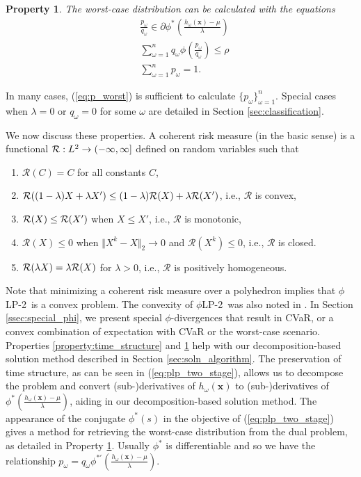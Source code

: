 \documentclass[ijoc,letterpaper]{informs3} %
\newcommand{\x}{\mathbf{x}}
\newtheorem{property}[theorem]{Property}
\newcommand{\plp}{$\phi$LP-2}
\begin{document}
\begin{property}
	\label{property:primal_dual_relation}
	The worst-case distribution can be calculated with the equations
	\begin{align} 
		& \frac{p_\omega}{q_\omega} \in \partial \phi^*\left(\frac{h_\omega(\x)-\mu}{\lambda}\right) \label{eq:p_worst} \\
		& \sum_{\omega=1}^n q_\omega \phi\left(\frac{p_\omega}{q_\omega}\right) \leq \rho \nonumber \\
		& \sum_{\omega=1}^n p_\omega = 1. \nonumber
	\end{align}
\end{property}
In many cases, (\ref{eq:p_worst}) is sufficient to calculate $\{p_\omega\}_{\omega=1}^n$.
Special cases when $\lambda = 0$ or $q_\omega = 0$ for some $\omega$ are detailed in Section \ref{sec:classification}.

We now discuss these properties. A coherent risk measure (in the basic sense) is a functional ${\cal R}: L^2 \rightarrow (-\infty,\infty]$ defined on random variables such that \citep{rockafellar2007coherent}
\begin{enumerate}
	\item $\mathcal{R}(C) = C$ for all constants $C$,
	\item $\mathcal{R}((1-\lambda)X + \lambda X') \leq (1-\lambda){\cal R}(X) + \lambda {\cal R}(X')$, i.e., $\mathcal{R}$ is convex,
	\item $\mathcal{R}(X) \leq {\cal R}(X')$ when $X \leq X'$, i.e., $\mathcal{R}$ is monotonic,
	\item $\mathcal{R}(X) \leq 0$ when $\Vert X^k - X \Vert_2 \rightarrow 0$ and $\mathcal{R}(X^k) \leq 0$, i.e., $\mathcal{R}$ is closed.
	\item $\mathcal{R}(\lambda X) = \lambda {\cal R}(X)$ for $\lambda > 0$, i.e., $\mathcal{R}$ is positively homogeneous.
\end{enumerate}

\noindent Note that minimizing a coherent risk measure over a polyhedron implies that \plp\ is a convex problem.
The convexity of \plp\ was also noted in \citep{bental2011robust}.
In Section \ref{ssec:special_phi}, we present special $\phi$-divergences that result in CVaR, or a convex combination of expectation with CVaR or the worst-case scenario. 
Properties \ref{property:time_structure} and \ref{property:primal_dual_relation} help with our decomposition-based solution method described in Section \ref{sec:soln_algorithm}. 
The preservation of time structure, as can be seen in (\ref{eq:plp_two_stage}), allows us to decompose the problem and convert (sub-)derivatives of $h_\omega(\x)$ to (sub-)derivatives of $\phi^*\left(\frac{h_\omega(\x) - \mu}{\lambda}\right)$, aiding in our decomposition-based solution method. 
The appearance of the conjugate $\phi^*(s)$ in the objective of (\ref{eq:plp_two_stage}) gives a method for retrieving the worst-case distribution from the dual problem, as detailed in Property \ref{property:primal_dual_relation}.  
Usually $\phi^*$ is differentiable and so we have the relationship $p_\omega = q_\omega \phi^{* \prime}(\frac{h_\omega(\x)-\mu}{\lambda})$. 
\end{document}
